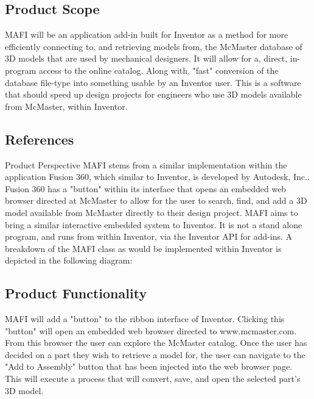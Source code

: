\documentclass[12pt, letterpaper]{article}
\begin{document}
\subsection{Product Scope}
MAFI will be an application add-in built for Inventor as a method for more efficiently connecting to, and retrieving models from, the McMaster database of 3D models that are used by mechanical designers. It will allow for a, direct, in-program access to the online catalog. Along with, "fast" conversion of the database file-type into something usable by an Inventor user. This is a software that should speed up design projects for engineers who use 3D models available from McMaster, within Inventor.
\subsection{References}
\begingroup
\renewcommand{\section}[2]{}


\endgroup
\section{General Description}
\subsection{Product Perspective}
MAFI stems from a similar implementation within the application Fusion 360, which similar to Inventor, is developed by Autodesk, Inc.. Fusion 360 has a "button" within its interface that opens an embedded web browser directed at McMaster to allow for the user to search, find, and add a 3D model available from McMaster directly to their design project. MAFI aims to bring a similar interactive embedded system to Inventor. It is not a stand alone program, and runs from within Inventor, via the Inventor API for add-ins. A breakdown of the MAFI class as would be implemented within Inventor is depicted in the following diagram:


\subsection{Product Functionality}
MAFI will add a "button" to the ribbon interface of Inventor. Clicking this "button" will open an embedded web browser directed to www.mcmaster.com. From this browser the user can explore the McMaster catalog. Once the user has decided on a part they wish to retrieve a model for, the user can navigate to the "Add to Assembly" button that has been injected into the web browser page. This will execute a process that will convert, save, and open the selected part's 3D model. 
\end{document}
